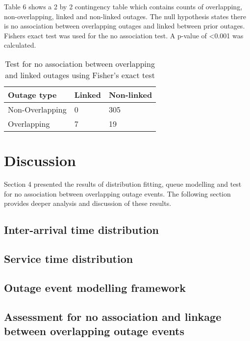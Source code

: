 \documentclass[5p]{elsarticle}
\begin{document}
Table 6 shows a 2 by 2 contingency table which contains counts of overlapping, non-overlapping, linked and non-linked outages. The null hypothesis states there is no association between overlapping outages and linked between prior outages. Fishers exact test was used for the no association test. A p-value of \textless 0.001 was calculated. 

\begin {table}
\caption {Test for no association between overlapping and linked outages using Fisher's exact test} 
\begin{center}
\begin{tabular}{p{2.7cm} |  p{1.1cm} | p{2cm}} \hline \bf{Outage type} & \bf{Linked}  & \bf{Non-linked}
\\ \hline Non-Overlapping  & 0 & 305
\\ Overlapping & 7 & 19
\\ \hline
\end{tabular}
\end{center}
\end{table}

\section{Discussion}

Section 4 presented the results of distribution fitting, queue modelling and test for no association between overlapping outage events. The following section provides deeper analysis and discussion of these results.

\subsection{Inter-arrival time distribution}

\subsection{Service time distribution}

\subsection{Outage event modelling framework}

\subsection{Assessment for no association and linkage between overlapping outage events}
\end{document}
